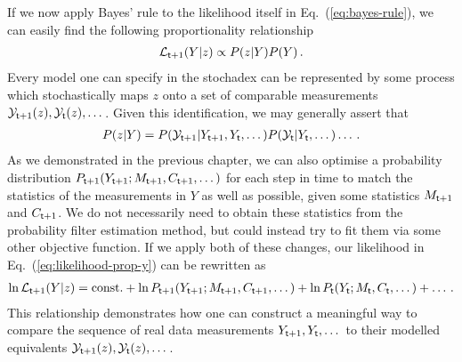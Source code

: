 If we now apply Bayes' rule to the likelihood itself in Eq.~(\ref{eq:bayes-rule}), we can easily find the following proportionality relationship
\begin{align}
{\cal L}_{{\sf t}+1}(Y\vert z) \propto P(z\vert Y)P(Y) \label{eq:likelihood-prop-y}\,.
\end{align}
Every model one can specify in the stochadex can be represented by some process which stochastically maps $z$ onto a set of comparable measurements ${\cal Y}_{{\sf t}+1}(z), {\cal Y}_{{\sf t}}(z), \dots$. Given this identification, we may generally assert that 
\begin{align}
P(z\vert Y) = P( {\cal Y}_{{\sf t}+1} \vert Y_{{\sf t}+1}, Y_{{\sf t}}, \dots)P({\cal Y}_{{\sf t}}\vert Y_{{\sf t}}, \dots) \dots \,.
\end{align}
As we demonstrated in the previous chapter, we can also optimise a probability distribution $P_{{\sf t}+1}(Y_{{\sf t}+1};M_{{\sf t}+1},C_{{\sf t}+1}, \dots)$ for each step in time to match the statistics of the measurements in $Y$ as well as possible, given some statistics $M_{{\sf t}+1}$ and $C_{{\sf t}+1}$. We do not necessarily need to obtain these statistics from the probability filter estimation method, but could instead try to fit them via some other objective function. If we apply both of these changes, our likelihood in Eq.~(\ref{eq:likelihood-prop-y}) can be rewritten as
\begin{align}
\ln {\cal L}_{{\sf t}+1}(Y\vert z) = {\rm const.} + \ln P_{{\sf t}+1}(Y_{{\sf t}+1};M_{{\sf t}+1},C_{{\sf t}+1},\dots ) + \ln P_{{\sf t}}(Y_{{\sf t}};M_{{\sf t}},C_{{\sf t}},\dots ) + \dots \label{eq:data-likelihood-for-model} \,.
\end{align}
This relationship demonstrates how one can construct a meaningful way to compare the sequence of real data measurements $Y_{{\sf t}+1}, Y_{{\sf t}}, \dots$ to their modelled equivalents ${\cal Y}_{{\sf t}+1}(z), {\cal Y}_{{\sf t}}(z), \dots$.

